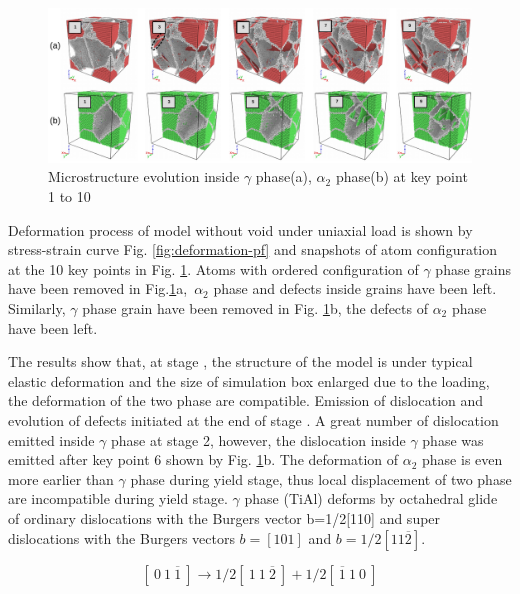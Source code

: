 \documentclass[metals,article,submit,moreauthors,pdftex,10pt,a4paper]{Definitions/mdpi}
\begin{document}
\begin{figure}[ht] 
	\centering
	\includegraphics[width=1\linewidth]{img/def2}
	\caption{Microstructure evolution inside $\gamma$ phase(a), $\alpha_2$ phase(b) at key point 1 to 10}
	\label{fig:Defect}
\end{figure}

Deformation process of model without void under uniaxial load is shown by stress-strain curve Fig. \ref{fig:deformation-pf} and snapshots of atom configuration at the 10 key points in Fig. \ref{fig:Defect}.  Atoms with ordered configuration  of $\gamma$ phase grains have been removed in Fig.\ref{fig:Defect}a,\ $\alpha_2$ phase and defects inside grains have been left. Similarly, $\gamma$ phase grain have been removed in Fig. \ref{fig:Defect}b, the defects of $\alpha_2$ phase have been left.  


The results show that, at stage \uppercase\expandafter{}, the structure of the model is under typical elastic deformation and the size of simulation box enlarged due to the loading, the deformation of the two phase are compatible. Emission of dislocation and evolution of defects initiated at the end of stage \uppercase\expandafter{}. A  great number of dislocation emitted inside $\gamma$ phase at stage 2, however, the dislocation inside $\gamma$ phase was emitted after key point 6 shown by Fig. \ref{fig:Defect}b. The deformation of $\alpha_2$ phase is even more earlier than $\gamma$ phase during yield stage, thus local displacement of two phase are incompatible during yield stage.  $\gamma$ phase (TiAl) deforms by octahedral glide of ordinary dislocations with the Burgers vector b=1/2[110] and super dislocations with the Burgers vectors $b=[101]$ and $b=1/2[11\overline{2}]$. 

\begin{equation}\label{eq:dis1}
	[\ 0\ 1\ \overline{1}\ ] \to 1/2 [\ 1\ 1\ \overline{2}\ ]+1/2[\ \overline{1}\ 1\ 0\ ]
\end{equation}
\end{document}
